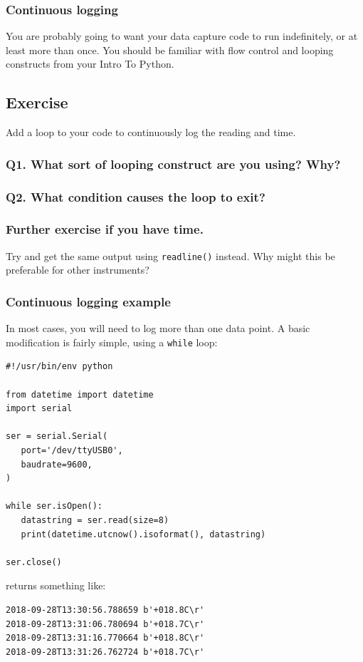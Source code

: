 \documentclass[aspectratio=1610,9pt]{beamer} %
\begin{document}
\begin{frame}
\frametitle{Continuous logging}

You are probably going to want your data capture code to run
indefinitely, or at least more than once. You should be familiar with
flow control and looping constructs from your Intro To Python.

\subsection{Exercise}

Add a loop to your code to continuously log the reading and time.

\subsubsection{Q1. What sort of looping construct are you using?
Why?}

\subsubsection{Q2. What condition causes the loop to
exit?}

\subsubsection{Further exercise if you have
time.}

Try and get the same output using \texttt{readline()} instead. Why might
this be preferable for other instruments?

\end{frame}
\begin{frame}[fragile]
\frametitle{Continuous logging example}

In most cases, you will need to log more than one data point. A basic
modification is fairly simple, using a \texttt{while} loop:

\begin{verbatim}
#!/usr/bin/env python

from datetime import datetime
import serial

ser = serial.Serial(
   port='/dev/ttyUSB0',
   baudrate=9600,
)

while ser.isOpen():
   datastring = ser.read(size=8)
   print(datetime.utcnow().isoformat(), datastring)

ser.close()
\end{verbatim}

returns something like:

\begin{verbatim}
2018-09-28T13:30:56.788659 b'+018.8C\r'
2018-09-28T13:31:06.780694 b'+018.7C\r'
2018-09-28T13:31:16.770664 b'+018.8C\r'
2018-09-28T13:31:26.762724 b'+018.7C\r'
\end{verbatim}

\end{frame}
\end{document}
